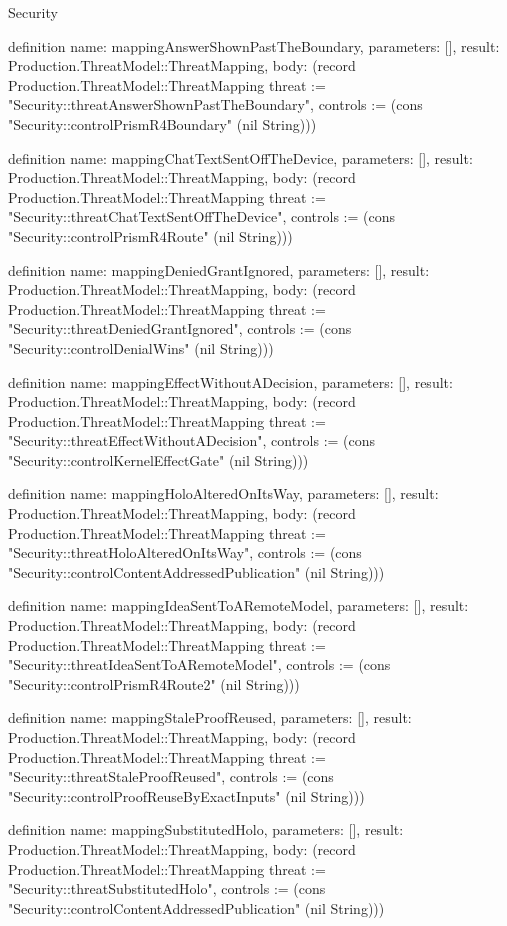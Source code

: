 \begin{lexlean}{Security}
\begin{semanticmodule}
definition{
  name: mappingAnswerShownPastTheBoundary,
  parameters: [],
  result: Production.ThreatModel::ThreatMapping,
  body: (record Production.ThreatModel::ThreatMapping {threat := "Security::threatAnswerShownPastTheBoundary", controls := (cons "Security::controlPrismR4Boundary" (nil String))})
}

definition{
  name: mappingChatTextSentOffTheDevice,
  parameters: [],
  result: Production.ThreatModel::ThreatMapping,
  body: (record Production.ThreatModel::ThreatMapping {threat := "Security::threatChatTextSentOffTheDevice", controls := (cons "Security::controlPrismR4Route" (nil String))})
}

definition{
  name: mappingDeniedGrantIgnored,
  parameters: [],
  result: Production.ThreatModel::ThreatMapping,
  body: (record Production.ThreatModel::ThreatMapping {threat := "Security::threatDeniedGrantIgnored", controls := (cons "Security::controlDenialWins" (nil String))})
}

definition{
  name: mappingEffectWithoutADecision,
  parameters: [],
  result: Production.ThreatModel::ThreatMapping,
  body: (record Production.ThreatModel::ThreatMapping {threat := "Security::threatEffectWithoutADecision", controls := (cons "Security::controlKernelEffectGate" (nil String))})
}

definition{
  name: mappingHoloAlteredOnItsWay,
  parameters: [],
  result: Production.ThreatModel::ThreatMapping,
  body: (record Production.ThreatModel::ThreatMapping {threat := "Security::threatHoloAlteredOnItsWay", controls := (cons "Security::controlContentAddressedPublication" (nil String))})
}

definition{
  name: mappingIdeaSentToARemoteModel,
  parameters: [],
  result: Production.ThreatModel::ThreatMapping,
  body: (record Production.ThreatModel::ThreatMapping {threat := "Security::threatIdeaSentToARemoteModel", controls := (cons "Security::controlPrismR4Route2" (nil String))})
}

definition{
  name: mappingStaleProofReused,
  parameters: [],
  result: Production.ThreatModel::ThreatMapping,
  body: (record Production.ThreatModel::ThreatMapping {threat := "Security::threatStaleProofReused", controls := (cons "Security::controlProofReuseByExactInputs" (nil String))})
}

definition{
  name: mappingSubstitutedHolo,
  parameters: [],
  result: Production.ThreatModel::ThreatMapping,
  body: (record Production.ThreatModel::ThreatMapping {threat := "Security::threatSubstitutedHolo", controls := (cons "Security::controlContentAddressedPublication" (nil String))})
}


\end{semanticmodule}
\end{lexlean}
